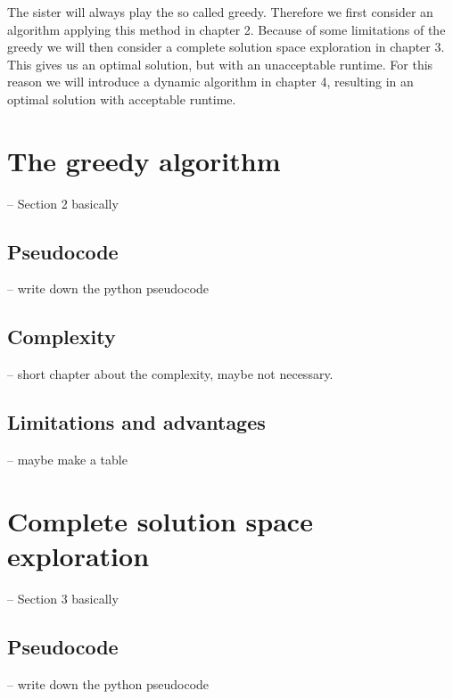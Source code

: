\documentclass[a4paper,12pt]{article}
\begin{document}
The sister will always play the so called \gls{greedy}. Therefore we first consider an algorithm applying this method in chapter 2. Because of some limitations of the \gls{greedy} we will then consider a complete solution space exploration in chapter 3. This gives us an optimal solution, but with an unacceptable runtime. For this reason we will introduce a dynamic algorithm in chapter 4, resulting in an optimal solution with acceptable runtime.


\newpage

\section{The greedy algorithm}
-- Section 2 basically

\subsection{Pseudocode}
-- write down the python pseudocode

\subsection{Complexity}
-- short chapter about the complexity, maybe not necessary.

\subsection{Limitations and advantages}
-- maybe make a table



\newpage

\section{Complete solution space exploration}
-- Section 3 basically

\subsection{Pseudocode}
-- write down the python pseudocode
\end{document}
